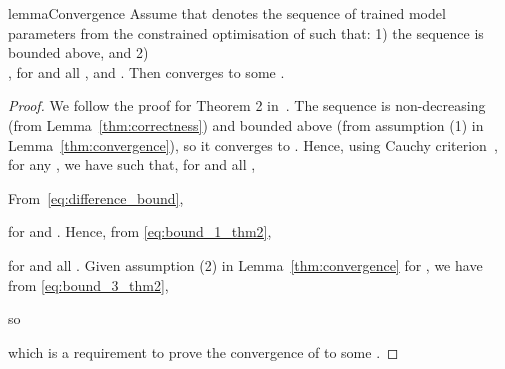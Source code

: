 \documentclass[letterpaper]{article} \usepackage{aaai22}  \usepackage{times}  \usepackage{helvet}  \usepackage{courier}  \usepackage[hyphens]{url}  \usepackage{graphicx} \urlstyle{rm} \def\UrlFont{\rm}  \usepackage{natbib}  \usepackage{caption} \DeclareCaptionStyle{ruled}{labelfont=normalfont,labelsep=colon,strut=off} \frenchspacing  \setlength{\pdfpagewidth}{8.5in}  \setlength{\pdfpageheight}{11in}  \usepackage{algorithm}
\begin{document}
\begin{restatable}[]{lemma}{Convergence}
    \label{thm:convergence}
    Assume that  denotes the sequence of trained model parameters from the constrained optimisation of  such that: 1) the sequence  is bounded above, and 2) 
    \scalebox{0.79}{} \\
    \scalebox{0.8}{
    }, 
    for  and all , and .  
    Then  converges to some .
 \end{restatable}
\begin{proof}
We follow the proof for Theorem 2 in~\citep{dempster1977maximum}.
The sequence  is non-decreasing (from Lemma~\ref{thm:correctness}) and bounded  above (from assumption (1) in Lemma~\ref{thm:convergence}), so it converges to . 
Hence, using Cauchy criterion~\citep{nguyen2020tutorial}, for any , we have  such that, for  and all ,

From~\eqref{eq:difference_bound},

for  and . Hence, from \eqref{eq:bound_1_thm2},

for  and all .
Given assumption (2) in Lemma~\ref{thm:convergence} for , we
 have from \eqref{eq:bound_3_thm2},
 
so

 which is a requirement to prove the convergence of  to some .
\end{proof}
\end{document}
